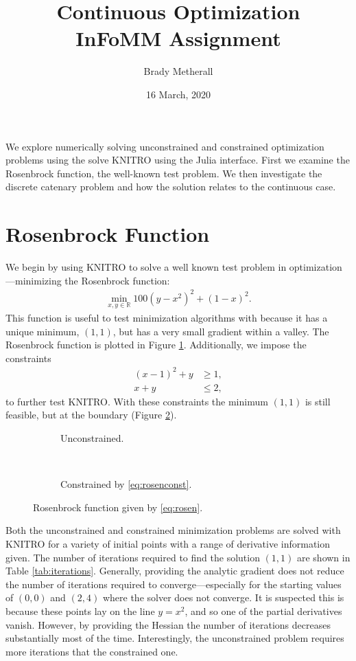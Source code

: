 \documentclass[11pt,a4paper,twocolumn]{article}
\title{Continuous Optimization \\ InFoMM Assignment}
\author{Brady Metherall}
\date{16 March, 2020}
\begin{document}
\maketitle

We explore numerically solving unconstrained and constrained optimization problems using the solve KNITRO using the Julia interface. First we examine the Rosenbrock function, the well-known test problem. We then investigate the discrete catenary problem and how the solution relates to the continuous case.

\section{Rosenbrock Function}
We begin by using KNITRO to solve a well known test problem in optimization---minimizing the Rosenbrock function:
\begin{align}
	\min_{x, y \in \mathbb{R}} 100(y - x^2)^2 + (1 - x)^2.
	\label{eq:rosen}
\end{align}
This function is useful to test minimization algorithms with because it has a unique minimum, $(1,1)$, but has a very small gradient within a valley. The Rosenbrock function is plotted in Figure \ref{fig:rosenunconst}. Additionally, we impose the constraints 
\begin{equation}
	\begin{aligned}
		(x - 1)^2 + y &\geq 1, \\
		x + y &\leq 2,
	\end{aligned}
	\label{eq:rosenconst}
\end{equation}
to further test KNITRO. With these constraints the minimum $(1,1)$ is still feasible, but at the boundary (Figure \ref{fig:rosenconst}).

\begin{figure}[tb]
	\centering
	\begin{subfigure}{\columnwidth}
		\centering
		
		\caption{Unconstrained.}
		\label{fig:rosenunconst}
	\end{subfigure} \\
	\begin{subfigure}{\columnwidth}
		\centering
		
		\caption{Constrained by \eqref{eq:rosenconst}.}
		\label{fig:rosenconst}
	\end{subfigure}
	\caption{Rosenbrock function given by \eqref{eq:rosen}.}
	\label{fig:rosen}
\end{figure}

Both the unconstrained and constrained minimization problems are solved with KNITRO for a variety of initial points with a range of derivative information given. The number of iterations required to find the solution $(1,1)$ are shown in Table \ref{tab:iterations}. Generally, providing the analytic gradient does not reduce the number of iterations required to converge---especially for the starting values of $(0,0)$ and $(2,4)$ where the solver does not converge. It is suspected this is because these points lay on the line $y = x^2$, and so one of the partial derivatives vanish. However, by providing the Hessian the number of iterations decreases substantially most of the time. Interestingly, the unconstrained problem requires more iterations that the constrained one.
\end{document}
